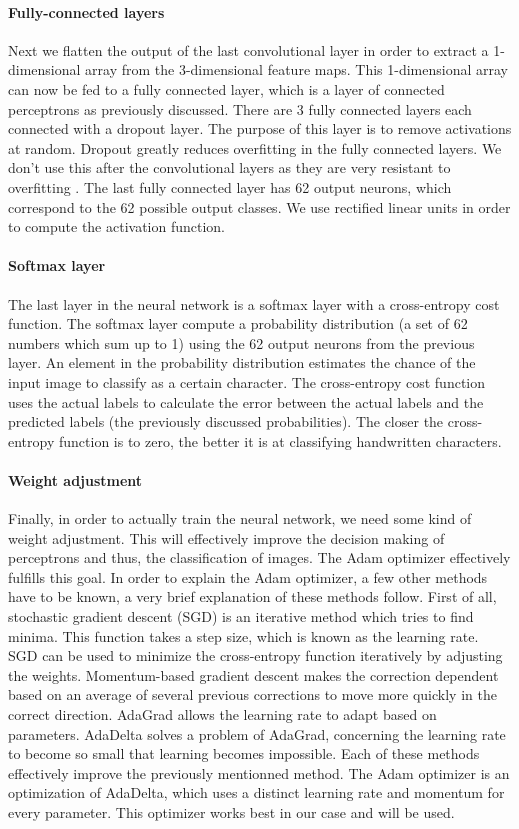 \documentclass{article}
\begin{document}
\paragraph{Fully-connected layers}
Next we flatten the output of the last convolutional layer in order to extract a 1-dimensional array from the 3-dimensional feature maps. This 1-dimensional array can now be fed to a fully connected layer, which is a layer of connected perceptrons as previously discussed. 
There are 3 fully connected layers each connected with a dropout layer. The purpose of this layer is to remove activations at random. Dropout greatly reduces overfitting in the fully connected layers. We don't use this after the convolutional layers as they are very resistant to overfitting \cite{nnbook}. 
The last fully connected layer has 62 output neurons, which correspond to the 62 possible output classes. We use rectified linear units in order to compute the activation function.
\paragraph{Softmax layer}
 The last layer in the neural network is a softmax layer with a cross-entropy cost function. The softmax layer compute a probability distribution (a set of 62 numbers which sum up to 1) using the 62 output neurons from the previous layer. An element in the probability distribution estimates the chance of the input image to classify as a certain character. 
 The cross-entropy cost function uses the actual labels to calculate the error between the actual labels and the predicted labels (the previously discussed probabilities). The closer the cross-entropy function is to zero, the better it is at classifying handwritten characters.
 \paragraph{Weight adjustment}
Finally, in order to actually train the neural network, we need some kind of weight adjustment. This will effectively improve the decision making of perceptrons and thus, the classification of images. 
The Adam optimizer effectively fulfills this goal. In order to explain the Adam optimizer, a few other methods have to be known, a very brief explanation of these methods follow. 
First of all, stochastic gradient descent (SGD) is an iterative method which tries to find minima. This function takes a step size, which is known as the learning rate. SGD can be used to minimize the cross-entropy function iteratively by adjusting the weights. 
Momentum-based gradient descent makes the correction dependent based on an average of several previous corrections to move more quickly in the correct direction. 
AdaGrad allows the learning rate to adapt based on parameters. AdaDelta solves a problem of AdaGrad, concerning the learning rate to become so small that learning becomes impossible. 
Each of these methods effectively improve the previously mentionned method. 
The Adam optimizer is an optimization of AdaDelta, which uses a distinct learning rate and momentum for every parameter. This optimizer works best in our case and will be used. 
\end{document}
